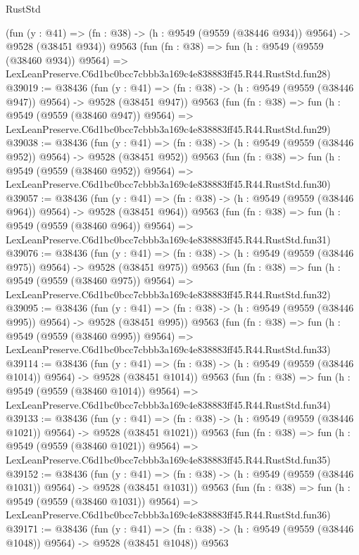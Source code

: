 \begin{lexlean}{RustStd}
\begin{coremodule}
    (fun (y : @41) => (fn : @38) -> (h : @9549 (@9559 (@38446 @934)) @9564) -> @9528 (@38451 @934))
    @9563
    (fun (fn : @38) =>
    fun (h : @9549 (@9559 (@38460 @934)) @9564) =>
    LexLeanPreserve.C6d1bc0bcc7cbbb3a169c4e838883ff45.R44.RustStd.fun28)
@39019 := @38436
    (fun (y : @41) => (fn : @38) -> (h : @9549 (@9559 (@38446 @947)) @9564) -> @9528 (@38451 @947))
    @9563
    (fun (fn : @38) =>
    fun (h : @9549 (@9559 (@38460 @947)) @9564) =>
    LexLeanPreserve.C6d1bc0bcc7cbbb3a169c4e838883ff45.R44.RustStd.fun29)
@39038 := @38436
    (fun (y : @41) => (fn : @38) -> (h : @9549 (@9559 (@38446 @952)) @9564) -> @9528 (@38451 @952))
    @9563
    (fun (fn : @38) =>
    fun (h : @9549 (@9559 (@38460 @952)) @9564) =>
    LexLeanPreserve.C6d1bc0bcc7cbbb3a169c4e838883ff45.R44.RustStd.fun30)
@39057 := @38436
    (fun (y : @41) => (fn : @38) -> (h : @9549 (@9559 (@38446 @964)) @9564) -> @9528 (@38451 @964))
    @9563
    (fun (fn : @38) =>
    fun (h : @9549 (@9559 (@38460 @964)) @9564) =>
    LexLeanPreserve.C6d1bc0bcc7cbbb3a169c4e838883ff45.R44.RustStd.fun31)
@39076 := @38436
    (fun (y : @41) => (fn : @38) -> (h : @9549 (@9559 (@38446 @975)) @9564) -> @9528 (@38451 @975))
    @9563
    (fun (fn : @38) =>
    fun (h : @9549 (@9559 (@38460 @975)) @9564) =>
    LexLeanPreserve.C6d1bc0bcc7cbbb3a169c4e838883ff45.R44.RustStd.fun32)
@39095 := @38436
    (fun (y : @41) => (fn : @38) -> (h : @9549 (@9559 (@38446 @995)) @9564) -> @9528 (@38451 @995))
    @9563
    (fun (fn : @38) =>
    fun (h : @9549 (@9559 (@38460 @995)) @9564) =>
    LexLeanPreserve.C6d1bc0bcc7cbbb3a169c4e838883ff45.R44.RustStd.fun33)
@39114 := @38436
    (fun (y : @41) =>
    (fn : @38) -> (h : @9549 (@9559 (@38446 @1014)) @9564) -> @9528 (@38451 @1014))
    @9563
    (fun (fn : @38) =>
    fun (h : @9549 (@9559 (@38460 @1014)) @9564) =>
    LexLeanPreserve.C6d1bc0bcc7cbbb3a169c4e838883ff45.R44.RustStd.fun34)
@39133 := @38436
    (fun (y : @41) =>
    (fn : @38) -> (h : @9549 (@9559 (@38446 @1021)) @9564) -> @9528 (@38451 @1021))
    @9563
    (fun (fn : @38) =>
    fun (h : @9549 (@9559 (@38460 @1021)) @9564) =>
    LexLeanPreserve.C6d1bc0bcc7cbbb3a169c4e838883ff45.R44.RustStd.fun35)
@39152 := @38436
    (fun (y : @41) =>
    (fn : @38) -> (h : @9549 (@9559 (@38446 @1031)) @9564) -> @9528 (@38451 @1031))
    @9563
    (fun (fn : @38) =>
    fun (h : @9549 (@9559 (@38460 @1031)) @9564) =>
    LexLeanPreserve.C6d1bc0bcc7cbbb3a169c4e838883ff45.R44.RustStd.fun36)
@39171 := @38436
    (fun (y : @41) =>
    (fn : @38) -> (h : @9549 (@9559 (@38446 @1048)) @9564) -> @9528 (@38451 @1048))
    @9563

\end{coremodule}
\end{lexlean}

